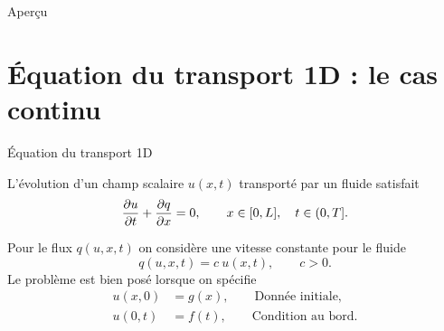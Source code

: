 \documentclass[aspectratio=169, french]{beamer}
\begin{document}
	
	
\begin{frame}[plain]
	
	
	
\end{frame}
	
	
\begin{frame}{Aperçu}
	
	\tableofcontents
	
\end{frame}

\section{Équation du transport 1D : le cas continu}

\begin{frame}{Équation du transport 1D}
	\begin{tcolorbox}[title = L'EDP la plus simple, coltitle=white]
		L'évolution d'un champ scalaire $u(x, t)$ transporté par un fluide satisfait 
		\begin{equation*}
			\diffp{u}{t} + \diffp{q}{x} = 0, \qquad x \in [0, L], \quad t \in  (0, T]. 
		\end{equation*}
	\end{tcolorbox}

\begin{tcolorbox}
	Pour le flux $q(u, x, t)$ on considère une vitesse constante pour le fluide
	\begin{equation*}
		q(u, x, t) = c \ u(x, t), \qquad c>0.
	\end{equation*}
	Le problème est bien posé lorsque on spécifie 
	\begin{align*}
		u(x, 0) &= g(x), \qquad \text{Donnée initiale}, \\
		u(0, t) &= f(t), \qquad \text{Condition au bord}.
	\end{align*}
\end{tcolorbox}

\end{frame}
\end{document}
